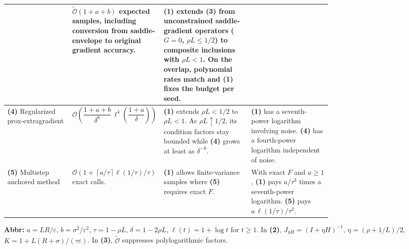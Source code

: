 \begin{table}[tp]
\begin{threeparttable}
\begin{tabularx}{\linewidth}{@{}>{\raggedright\arraybackslash}p{0.20\linewidth}>{\raggedright\arraybackslash}p{0.29\linewidth}>{\raggedright\arraybackslash}p{0.27\linewidth}>{\raggedright\arraybackslash}X@{}}
& $\widetilde{\mathcal{O}}(1+a+b)$ expected samples, including conversion from saddle-envelope to original gradient accuracy.
& \textbf{(1)} extends \textbf{(3)} from unconstrained saddle-gradient operators ($G=0$, $\rho L\le1/2$) to composite inclusions with $\rho L<1$. On the overlap, polynomial rates match and \textbf{(1)} fixes the budget per seed.
& \\
\midrule
\textbf{(4)} Regularized prox-extragradient \citep{frciRegularized}
& $\mathcal{O}\!\left(\dfrac{1+a+b}{\delta^8}\,\ell^4\!\left(\dfrac{1+a}{\delta}\right)\right)$
& \textbf{(1)} extends $\rho L<1/2$ to $\rho L<1$. As $\rho L\uparrow1/2$, its condition factors stay bounded while \textbf{(4)} grows at least as $\delta^{-8}$.
& \textbf{(1)} has a seventh-power logarithm involving noise. \textbf{(4)} has a fourth-power logarithm independent of noise. \\
\midrule
\textbf{(5)} Multistep anchored method \citep{frciMultistep}
& $\mathcal{O}\!\left(1+\left\lceil a/\tau\right\rceil\ell(1/\tau)/\tau\right)$ exact calls.
& \textbf{(1)} allows finite-variance samples where \textbf{(5)} requires exact $F$.
& With exact $F$ and $a\ge1$, \textbf{(1)} pays $a/\tau^3$ times a seventh-power logarithm. \textbf{(5)} pays $a\,\ell(1/\tau)/\tau^2$. \\
\bottomrule
\end{tabularx}
\begin{tablenotes}[flushleft]\footnotesize
\item[] \textbf{Abbr:} $a=LR/\varepsilon$, $b=\sigma^2/\varepsilon^2$, $\tau=1-\rho L$, $\delta=1-2\rho L$, $\ell(t)=1+\log t$ for $t\ge1$. In \textbf{(2)}, $J_{\eta H}=(I+\eta H)^{-1}$, $\eta=(\rho+1/L)/2$, $K=1+L(R+\sigma)/(\tau\varepsilon)$. In \textbf{(3)}, $\widetilde{\mathcal{O}}$ suppresses polylogarithmic factors.
\end{tablenotes}
\end{threeparttable}
\end{table}

